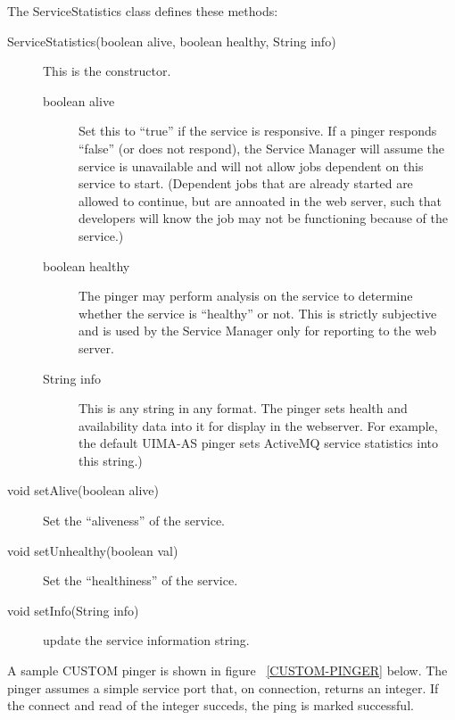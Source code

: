       The ServiceStatistics class defines these methods:
      \begin{description}
        \item[ServiceStatistics(boolean alive, boolean healthy, String info)] This is the constructor.
          \begin{description}
            \item[boolean alive] Set this to ``true'' if the service is responsive.  If a pinger responds
              ``false'' (or does not respond), the Service Manager will assume the service is unavailable
              and will not allow jobs dependent on this service to start.  (Dependent jobs that are already
              started are allowed to continue, but are annoated in the web server, such that developers
              will know the job may not be functioning because of the service.)
            \item[boolean healthy] The pinger may perform analysis on the service to determine whether
              the service is ``healthy'' or not.  This is strictly subjective and is used by the
              Service Manager only for reporting to the web server.
            \item[String info] This is any string in any format.  The pinger sets health and availability
              data into it for display in the webserver.  For example, the default UIMA-AS pinger sets
              ActiveMQ service statistics into this string.)
          \end{description}
          
          \item[void setAlive(boolean alive)] Set the ``aliveness'' of the service.

          \item[void setUnhealthy(boolean val)] Set the ``healthiness'' of the service.
            
          \item[void setInfo(String info)] update the service information string.
      \end{description}

      A sample CUSTOM pinger is shown in figure ~\ref{CUSTOM-PINGER} below. The pinger assumes a simple
      service port that, on connection, returns an integer.  If the connect and read of the integer succeds,
      the ping is marked successful. 

